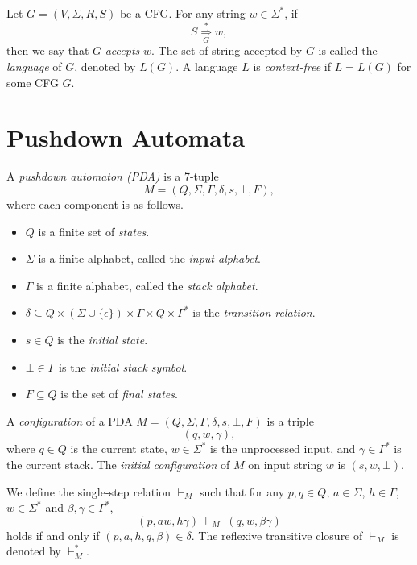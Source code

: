 \begin{definition}
  Let $G = (V, \Sigma, R, S)$ be a CFG.
  For any string $w \in \Sigma^*$, if
  \begin{equation*}
    S \mathrel{\mathop\Rightarrow\limits_G^*} w,
  \end{equation*}
  then we say that $G$ \emph{accepts} $w$.
  The set of string accepted by $G$ is called the \emph{language} of $G$,
  denoted by $L(G)$.
  A language $L$ is \emph{context-free} if $L = L(G)$ for some CFG $G$.
\end{definition}

\section{Pushdown Automata}
\begin{definition}
  A \emph{pushdown automaton (PDA)} is a 7-tuple
  \begin{equation*}
    M = (Q, \Sigma, \Gamma, \delta, s, \mathord\perp, F),
  \end{equation*}
  where each component is as follows.
  \begin{itemize}
    \item $Q$ is a finite set of \emph{states}.
    \item $\Sigma$ is a finite alphabet, called the \emph{input alphabet}.
    \item $\Gamma$ is a finite alphabet, called the \emph{stack alphabet}.
    \item $\delta \subseteq Q \times (\Sigma \cup \{\epsilon\}) \times \Gamma
    \times Q \times \Gamma^*$ is the \emph{transition relation}.
    \item $s \in Q$ is the \emph{initial state}.
    \item $\mathord\perp \in \Gamma$ is the \emph{initial stack symbol}.
    \item $F \subseteq Q$ is the set of \emph{final states}.
  \end{itemize}
\end{definition}

\begin{definition}
  A \emph{configuration} of a PDA $M = (Q, \Sigma, \Gamma, \delta, s,
  \mathord\perp, F)$ is a triple
  \begin{equation*}
    (q, w, \gamma),
  \end{equation*}
  where $q \in Q$ is the current state, $w \in \Sigma^*$ is the unprocessed
  input, and $\gamma \in \Gamma^*$ is the current stack.
  The \emph{initial configuration} of $M$ on input string $w$ is
  $(s, w, \mathord\perp)$.

  We define the single-step relation $\mathop\vdash_M$ such that for
  any $p, q \in Q$, $a \in \Sigma$, $h \in \Gamma$, $w \in \Sigma^*$ and
  $\beta, \gamma \in \Gamma^*$,
  \begin{equation*}
    (p, aw, h\gamma)
    \; \mathop\vdash\nolimits_M \;
    (q, w, \beta\gamma)
  \end{equation*}
  holds if and only if $(p, a, h, q, \beta) \in \delta$.
  The reflexive transitive closure of $\mathop\vdash_M$ is denoted by
  $\mathop\vdash_M^*$.
\end{definition}

